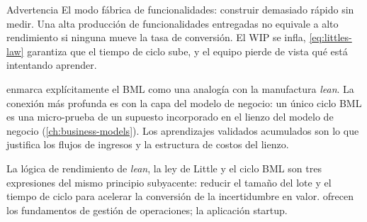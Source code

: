 \begin{admonition}{Advertencia}
El modo fábrica de funcionalidades: construir demasiado rápido sin medir. Una alta producción de funcionalidades entregadas no equivale a alto rendimiento si ninguna mueve la tasa de conversión. El WIP se infla, \cref{eq:littles-law} garantiza que el tiempo de ciclo sube, y el equipo pierde de vista qué está intentando aprender.
\end{admonition}

\textcite{ries2011} enmarca explícitamente el BML como una analogía con la manufactura \emph{lean}. La conexión más profunda es con la capa del modelo de negocio: un único ciclo BML es una micro-prueba de un supuesto incorporado en el lienzo del modelo de negocio (\cref{ch:business-models}). Los aprendizajes validados acumulados son lo que justifica los flujos de ingresos y la estructura de costos del lienzo.

La lógica de rendimiento de \emph{lean}, la ley de Little y el ciclo BML son tres expresiones del mismo principio subyacente: reducir el tamaño del lote y el tiempo de ciclo para acelerar la conversión de la incertidumbre en valor. \textcite{cachon2024matching} ofrecen los fundamentos de gestión de operaciones; \textcite{ries2011} la aplicación startup.
